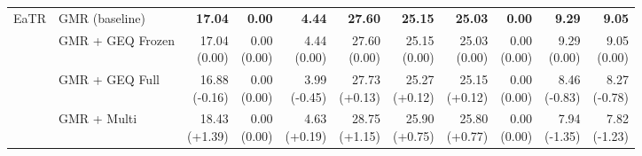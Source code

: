 \documentclass{article}
\begin{document}
{\begin{tabular}{llrrrrrrrrr}
\midrule
EaTR & GMR (baseline) & \textbf{17.04} & \textbf{0.00} & \textbf{4.44} & \textbf{27.60} & \textbf{25.15} & \textbf{25.03} & \textbf{0.00} & \textbf{9.29} & \textbf{9.05} \\
 & GMR + GEQ Frozen & \shortstack{17.04 \\ {\scriptsize\textcolor{Zero}{(0.00)}}} & \shortstack{0.00 \\ {\scriptsize\textcolor{Zero}{(0.00)}}} & \shortstack{4.44 \\ {\scriptsize\textcolor{Zero}{(0.00)}}} & \shortstack{27.60 \\ {\scriptsize\textcolor{Zero}{(0.00)}}} & \shortstack{25.15 \\ {\scriptsize\textcolor{Zero}{(0.00)}}} & \shortstack{25.03 \\ {\scriptsize\textcolor{Zero}{(0.00)}}} & \shortstack{0.00 \\ {\scriptsize\textcolor{Zero}{(0.00)}}} & \shortstack{9.29 \\ {\scriptsize\textcolor{Zero}{(0.00)}}} & \shortstack{9.05 \\ {\scriptsize\textcolor{Zero}{(0.00)}}} \\
 & GMR + GEQ Full & \shortstack{16.88 \\ {\scriptsize\textcolor{Loss}{(-0.16)}}} & \shortstack{0.00 \\ {\scriptsize\textcolor{Zero}{(0.00)}}} & \shortstack{3.99 \\ {\scriptsize\textcolor{Loss}{(-0.45)}}} & \shortstack{27.73 \\ {\scriptsize\textcolor{Gain}{(+0.13)}}} & \shortstack{25.27 \\ {\scriptsize\textcolor{Gain}{(+0.12)}}} & \shortstack{25.15 \\ {\scriptsize\textcolor{Gain}{(+0.12)}}} & \shortstack{0.00 \\ {\scriptsize\textcolor{Zero}{(0.00)}}} & \shortstack{8.46 \\ {\scriptsize\textcolor{Loss}{(-0.83)}}} & \shortstack{8.27 \\ {\scriptsize\textcolor{Loss}{(-0.78)}}} \\
 & GMR + Multi & \shortstack{18.43 \\ {\scriptsize\textcolor{Gain}{(+1.39)}}} & \shortstack{0.00 \\ {\scriptsize\textcolor{Zero}{(0.00)}}} & \shortstack{4.63 \\ {\scriptsize\textcolor{Gain}{(+0.19)}}} & \shortstack{28.75 \\ {\scriptsize\textcolor{Gain}{(+1.15)}}} & \shortstack{25.90 \\ {\scriptsize\textcolor{Gain}{(+0.75)}}} & \shortstack{25.80 \\ {\scriptsize\textcolor{Gain}{(+0.77)}}} & \shortstack{0.00 \\ {\scriptsize\textcolor{Zero}{(0.00)}}} & \shortstack{7.94 \\ {\scriptsize\textcolor{Loss}{(-1.35)}}} & \shortstack{7.82 \\ {\scriptsize\textcolor{Loss}{(-1.23)}}} \\

\end{tabular}}
\end{document}
